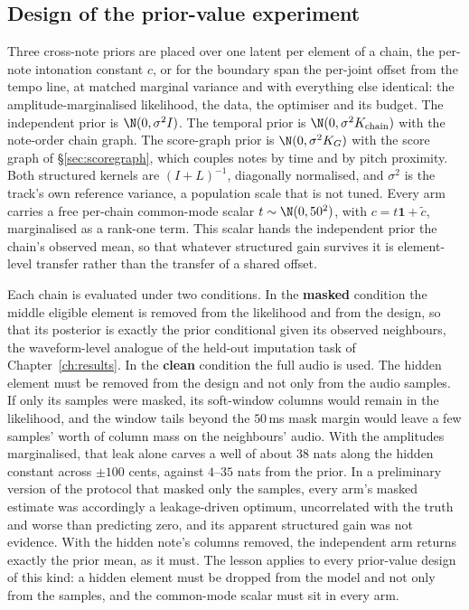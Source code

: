 \subsection{Design of the prior-value experiment}

Three cross-note priors are placed over one latent per element of a chain,
the per-note intonation constant $c$, or for the boundary span the per-joint
offset from the tempo line, at matched marginal variance and with
everything else identical: the amplitude-marginalised likelihood, the data,
the optimiser and its budget. The independent prior is $\N(0,\sigma^2 I)$.
The temporal prior is $\N(0,\sigma^2 K_{\mathrm{chain}})$ with the
note-order chain graph. The score-graph prior is $\N(0,\sigma^2 K_{G})$
with the score graph of \S\ref{sec:scoregraph}, which couples notes by time
and by pitch proximity. Both structured kernels are $(I+L)^{-1}$,
diagonally normalised, and $\sigma^2$ is the track's own reference
variance, a population scale that is not tuned. Every arm carries a free
per-chain common-mode scalar $t \sim \N(0, 50^2)$, with
$c = t\mathbf{1} + \tilde c$, marginalised as a rank-one term. This scalar
hands the independent prior the chain's observed mean, so that whatever
structured gain survives it is element-level transfer rather than the
transfer of a shared offset.

Each chain is evaluated under two conditions. In the \textbf{masked}
condition the middle eligible element is removed from the likelihood and
from the design, so that its posterior is exactly the prior conditional
given its observed neighbours, the waveform-level analogue of the held-out
imputation task of Chapter~\ref{ch:results}. In the \textbf{clean}
condition the full audio is used. The hidden element must be removed from
the design and not only from the audio samples. If only its samples were
masked, its soft-window columns would remain in the likelihood, and the
window tails beyond the $50$\,ms mask margin would leave a few samples'
worth of column mass on the neighbours' audio. With the amplitudes
marginalised, that leak alone carves a well of about $38$ nats along the
hidden constant across $\pm100$ cents, against $4$--$35$ nats from the
prior. In a preliminary version of the protocol that masked only the
samples, every arm's masked estimate was accordingly a leakage-driven
optimum, uncorrelated with the truth and worse than predicting zero, and
its apparent structured gain was not evidence. With the hidden note's
columns removed, the independent arm returns exactly the prior mean, as it
must. The lesson applies to every prior-value design of this kind: a hidden
element must be dropped from the model and not only from the samples, and
the common-mode scalar must sit in every arm.

